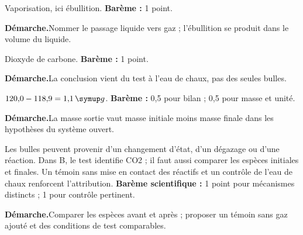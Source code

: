 \par\noindent\begin{minipage}{\linewidth}
Vaporisation, ici ébullition. \textbf{Barème :} 1 point.\par
\smallskip\noindent\textbf{Démarche.}\enspace Nommer le passage liquide vers gaz ; l’ébullition se produit dans le volume du liquide.\par
\end{minipage}\par
\par\noindent\begin{minipage}{\linewidth}
Dioxyde de carbone. \textbf{Barème :} 1 point.\par
\smallskip\noindent\textbf{Démarche.}\enspace La conclusion vient du test à l’eau de chaux, pas des seules bulles.\par
\end{minipage}\par
\par\noindent\begin{minipage}{\linewidth}
$120{,}0-118{,}9=1{,}1\unite g$. \textbf{Barème :} 0,5 pour bilan ; 0,5 pour masse et unité.\par
\smallskip\noindent\textbf{Démarche.}\enspace La masse sortie vaut masse initiale moins masse finale dans les hypothèses du système ouvert.\par
\end{minipage}\par
\par\noindent\begin{minipage}{\linewidth}
Les bulles peuvent provenir d’un changement d’état, d’un dégazage ou d’une réaction. Dans B, le test identifie CO2 ; il faut aussi comparer les espèces initiales et finales. Un témoin sans mise en contact des réactifs et un contrôle de l’eau de chaux renforcent l’attribution. \textbf{Barème scientifique :} 1 point pour mécanismes distincts ; 1 pour contrôle pertinent.\par
\smallskip\noindent\textbf{Démarche.}\enspace Comparer les espèces avant et après ; proposer un témoin sans gaz ajouté et des conditions de test comparables.\par
{}
\end{minipage}\par
